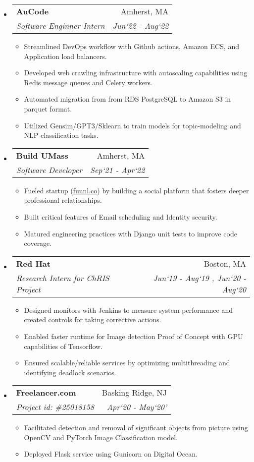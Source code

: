 \documentclass[letterpaper,8pt]{article}
\makeatletter
\newcommand{\resitem}[1]{\item #1 \vspace{-1pt}}
\newcommand{\resheading}[1]{{\normalsize \parashade[.9]{sharpcorners}{\textbf{#1 \vphantom{p\^{E}}}}}}
\newcommand{\ressubheading}[4]{
\begin{tabular*}{6.5in}{l@{\extracolsep{\fill}}r}
		\textbf{#1} & #2 \\
		\textit{#3} & \textit{#4} \\
\end{tabular*}\vspace{-4pt}}
\makeatother
\begin{document}
\resheading{Work Experience}
\begin{itemize}
\item
	\ressubheading{AuCode}{Amherst, MA}{Software Enginner Intern}{Jun`22 - Aug`22}
	\begin{itemize}
		\resitem{Streamlined DevOps workflow with Github actions, Amazon ECS, and Application load balancers.}
		\resitem{Developed web crawling infrastructure with autoscaling capabilities using Redis message queues and Celery workers.}
		\resitem{Automated migration from from RDS PostgreSQL to Amazon S3 in parquet format.}
		\resitem{Utilized Gensim/GPT3/Sklearn to train models for topic-modeling and NLP classification tasks.}
	\end{itemize}

\item
	\ressubheading{Build UMass}{Amherst, MA}{Software Developer}{Sep`21 - Apr`22}
	\begin{itemize}
		\resitem{Fueled startup (\href{https://funnl.co/}{funnl.co}) by building a social platform that fosters deeper professional relationships.}
		\resitem{Built critical features of Email scheduling and Identity security.}
		\resitem{Matured engineering practices with Django unit tests to improve code coverage.}
	\end{itemize}

\item 
	\ressubheading{Red Hat}{Boston, MA}{Research Intern for ChRIS Project}{Jun`19 - Aug`19 , Jun`20 - Aug`20}
	\begin{itemize}
		\resitem{Designed monitors with Jenkins to measure system performance and created controls for taking corrective actions.}
		\resitem{Enabled faster runtime for Image detection Proof of Concept with GPU capabilities of Tensorflow.}
		\resitem{Ensured scalable/reliable services by optimizing multithreading and identifying deadlock scenarios.}
	\end{itemize}

\item
	\ressubheading{Freelancer.com}{Basking Ridge, NJ}{Project id: \#25018158}{Apr`20 - May`20'}
	\begin{itemize}
		\resitem{Facilitated detection and removal of significant objects from picture using OpenCV and PyTorch Image Classification model.}
		\resitem{Deployed Flask service using Gunicorn on Digital Ocean.}
	\end{itemize}

\end{itemize}
\end{document}
